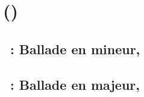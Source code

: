 \chapter[%
Fryderyk Chopin (\Dates{1810-03-01}{1849-10-17})][%
Fryderyk Chopin]{%
\FChopin{} ()}
\label{chap:Chopin}

\section{\ifChrono \Chopin{}~: \fi
Ballade  en \kG mineur, }
\label{\thesection}

\begin{workitemize}
 \item{}
 \begin{perfitemize}
  \item{}
 \end{perfitemize}
\end{workitemize}

\section{\ifChrono \Chopin{}~: \fi
Ballade  en \kA \Flat majeur, }
\label{\thesection}

